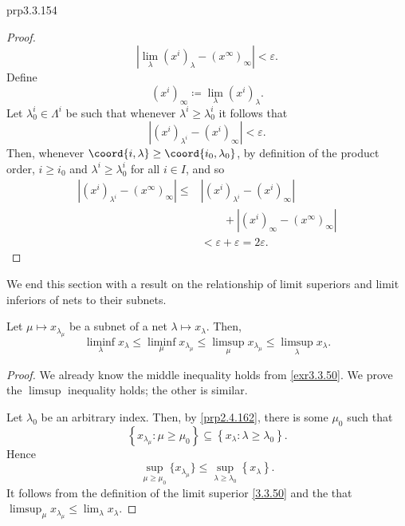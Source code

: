 \begin{prp}{}{prp3.3.154}
\begin{proof}
\begin{equation}
\left| \lim _\lambda (x^i)_\lambda -(x^\infty )_\infty \right| <\varepsilon .
\end{equation}
Define
\begin{equation}
(x^i)_\infty \coloneqq \lim _\lambda (x^i)_\lambda .
\end{equation}
Let $\lambda ^i_0\in \Lambda ^i$ be such that whenever $\lambda ^i\geq \lambda ^i_0$ it follows that
\begin{equation}
\left| (x^i)_{\lambda ^i}-(x^i)_\infty \right| <\varepsilon .
\end{equation}
Then, whenever $\coord{i,\lambda }\geq \coord{i_0,\lambda _0}$, by definition of the product order, $i\geq i_0$ and $\lambda ^i\geq \lambda ^i_0$ for all $i\in I$, and so
\begin{equation}
\begin{split}
\left| (x^i)_{\lambda ^i}-(x^\infty )_\infty \right| \leq & \left| (x^i)_{\lambda ^i}-(x^i)_\infty \right| \\ & \qquad +\left| (x^i)_\infty -(x^\infty )_\infty \right| \\
& <\varepsilon +\varepsilon =2\varepsilon .
\end{split}
\end{equation}
\end{proof}
\end{prp}

We end this section with a result on the relationship of limit superiors and limit inferiors of nets to their subnets.
\begin{prp}{}{}
Let $\mu \mapsto x_{\lambda _\mu}$ be a subnet of a net $\lambda \mapsto x_\lambda$.  Then,
\begin{equation*}
\liminf _\lambda x_\lambda \leq \liminf _\mu x_{\lambda _\mu}\leq \limsup _\mu x_{\lambda _\mu}\leq \limsup _\lambda x_\lambda .
\end{equation*}
\begin{proof}
We already know the middle inequality holds from \cref{exr3.3.50}.  We prove the $\limsup$ inequality holds; the other is similar.

Let $\lambda _0$ be an arbitrary index.  Then, by \cref{prp2.4.162}, there is some $\mu _0$ such that
\begin{equation}
\left\{ x_{\lambda _\mu}:\mu \geq \mu _0\right\} \subseteq \left\{ x_\lambda :\lambda \geq \lambda _0\right\} .
\end{equation}
Hence
\begin{equation}
\sup _{\mu \geq \mu _0}\{ x_{\lambda _\mu}\} \leq \sup _{\lambda \geq \lambda _0}\left\{ x_\lambda \right\} .
\end{equation}
It follows from the definition of the limit superior \eqref{3.3.50} and the  that $\limsup _\mu x_{\lambda _\mu}\leq \lim _\lambda x_\lambda$.
\end{proof}
\end{prp}

